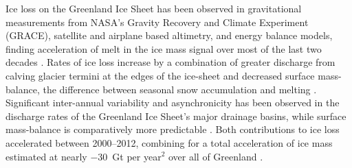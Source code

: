\documentclass[11pt]{report}
\begin{document}

Ice loss on the Greenland Ice Sheet has been observed in
gravitational measurements from NASA's Gravity
Recovery and Climate Experiment (GRACE), satellite and airplane based
altimetry, and energy balance models, finding acceleration of melt in the ice mass signal over most of the last two decades \cite[][]{khan2015,Harig+2016}. Rates of ice loss increase by a
combination of greater discharge from calving glacier termini at the edges of
the ice-sheet and decreased surface mass-balance, the difference between
seasonal snow accumulation and melting \cite[][]{khan2015,enderlin2014}.
Significant inter-annual variability and asynchronicity has been observed in
the discharge rates of the Greenland Ice Sheet's major drainage basins, while
surface mass-balance is comparatively more predictable
\cite[][]{mcmillan2016,enderlin2014}. Both contributions to ice loss accelerated between 2000--2012, combining for a total acceleration of ice mass
estimated at nearly $-30$~Gt per year$^2$ over all of Greenland
\cite[][]{velicogna2009,enderlin2014,bevis2019}.
\end{document}
